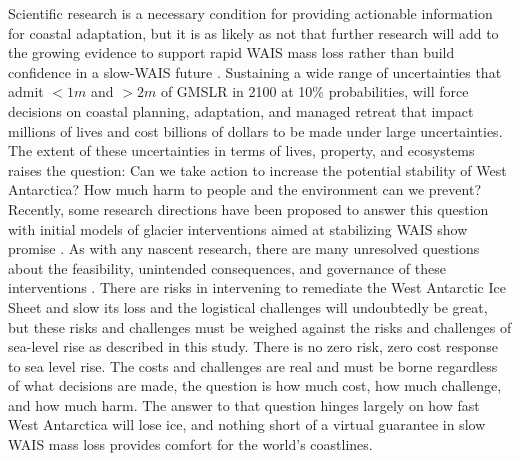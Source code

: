 \documentclass[12pt]{article}
\begin{document}
Scientific research is a necessary condition for providing actionable information for coastal adaptation, but it is as likely as not that further research will add to the growing evidence to support rapid WAIS mass loss rather than build confidence in a slow-WAIS future \citep{Fricker2025}. Sustaining a wide range of uncertainties that admit $<1 m$ and $> 2 m$ of GMSLR in 2100 at 10\% probabilities, will force decisions on coastal planning, adaptation, and managed retreat that impact millions of lives and cost billions of dollars to be made under large uncertainties. The extent of these uncertainties in terms of lives, property, and ecosystems raises the question: Can we take action to increase the potential stability of West Antarctica? How much harm to people and the environment can we prevent? Recently, some research directions have been proposed to answer this question \citep{MacAyeal2024} with initial models of glacier interventions aimed at stabilizing WAIS show promise \citep{Meyer2026}. As with any nascent research, there are many unresolved questions about the feasibility, unintended consequences, and governance of these interventions \citep{Siegert2025}. There are risks in intervening to remediate the West Antarctic Ice Sheet and slow its loss and the logistical challenges will undoubtedly be great, but these risks and challenges must be weighed against the risks and challenges of sea-level rise as described in this study. There is no zero risk, zero cost response to sea level rise. The costs and challenges are real and must be borne regardless of what decisions are made, the question is how much cost, how much challenge, and how much harm. The answer to that question hinges largely on how fast West Antarctica will lose ice, and nothing short of a virtual guarantee in slow WAIS mass loss provides comfort for the world's coastlines.   



\end{document}
